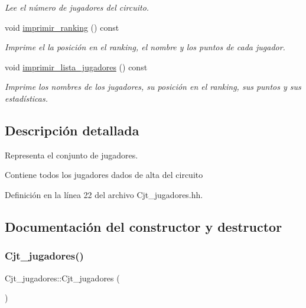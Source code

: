 \begin{DoxyCompactItemize}
\begin{DoxyCompactList}\small\item\em Lee el número de jugadores del circuito. \end{DoxyCompactList}\item 
void \hyperlink{class_cjt__jugadores_a2eca08ea3674049547e6eb6242da1df5}{imprimir\+\_\+ranking} () const
\begin{DoxyCompactList}\small\item\em Imprime el la posición en el ranking, el nombre y los puntos de cada jugador. \end{DoxyCompactList}\item 
void \hyperlink{class_cjt__jugadores_aeeb65f2beec6cac01abf0135b37dd104}{imprimir\+\_\+lista\+\_\+jugadores} () const
\begin{DoxyCompactList}\small\item\em Imprime los nombres de los jugadores, su posición en el ranking, sus puntos y sus estadísticas. \end{DoxyCompactList}\end{DoxyCompactItemize}


\subsection{Descripción detallada}
Representa el conjunto de jugadores. 

Contiene todos los jugadores dados de alta del circuito 

Definición en la línea 22 del archivo Cjt\+\_\+jugadores.\+hh.



\subsection{Documentación del constructor y destructor}
\mbox{\label{class_cjt__jugadores_af40661f610000ab6febf3ea0de7a451b}} 
\subsubsection{\texorpdfstring{Cjt\+\_\+jugadores()}{Cjt\_jugadores()}}
{\footnotesize\ttfamily Cjt\+\_\+jugadores\+::\+Cjt\+\_\+jugadores (\begin{DoxyParamCaption}{ }\end{DoxyParamCaption})}




